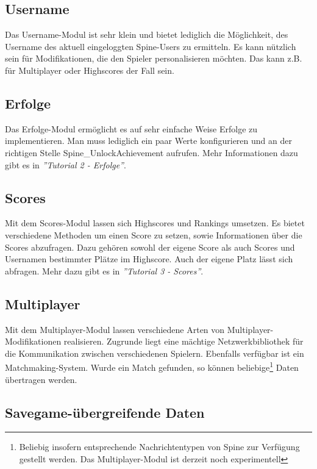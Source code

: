 \documentclass{article}
\begin{document}
\subsection{Username}

Das Username-Modul ist sehr klein und bietet lediglich die Möglichkeit, des Username des aktuell eingeloggten Spine-Users zu ermitteln. Es kann nützlich sein für Modifikationen, die den Spieler personalisieren möchten. Das kann z.B. für Multiplayer oder Highscores der Fall sein.

\subsection{Erfolge}

Das Erfolge-Modul ermöglicht es auf sehr einfache Weise Erfolge zu implementieren. Man muss lediglich ein paar Werte konfigurieren und an der richtigen Stelle Spine\_UnlockAchievement aufrufen. Mehr Informationen dazu gibt es in \textit{''Tutorial 2 - Erfolge''}.

\subsection{Scores}

Mit dem Scores-Modul lassen sich Highscores und Rankings umsetzen. Es bietet verschiedene Methoden um einen Score zu setzen, sowie Informationen über die Scores abzufragen. Dazu gehören sowohl der eigene Score als auch Scores und Usernamen bestimmter Plätze im Highscore. Auch der eigene Platz lässt sich abfragen. Mehr dazu gibt es in \textit{''Tutorial 3 - Scores''}.

\subsection{Multiplayer}

Mit dem Multiplayer-Modul lassen verschiedene Arten von Multiplayer-Modifikationen realisieren. Zugrunde liegt eine mächtige Netzwerkbibliothek für die Kommunikation zwischen verschiedenen Spielern. Ebenfalls verfügbar ist ein Matchmaking-System. Wurde ein Match gefunden, so können beliebige\footnote{Beliebig insofern entsprechende Nachrichtentypen von Spine zur Verfügung gestellt werden. Das Multiplayer-Modul ist derzeit noch experimentell} Daten übertragen werden.

\subsection{Savegame-übergreifende Daten}
\end{document}
